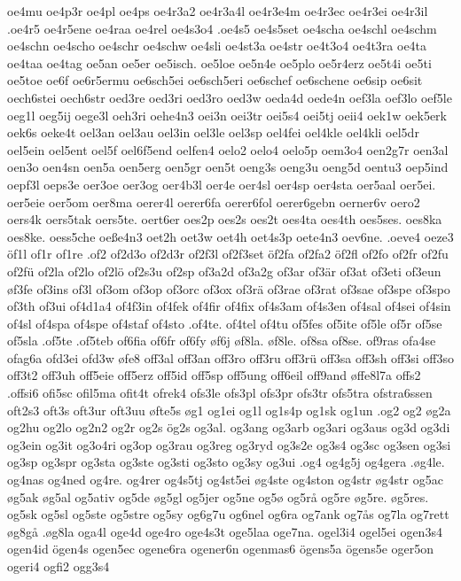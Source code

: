 {{oe4mu
oe4p3r
oe4pl
oe4ps
oe4r3a2
oe4r3a4l
oe4r3e4m
oe4r3ec
oe4r3ei
oe4r3il
.oe4r5
oe4r5ene
oe4raa
oe4rel
oe4s3o4
.oe4s5
oe4s5set
oe4scha
oe4schl
oe4schm
oe4schn
oe4scho
oe4schr
oe4schw
oe4sli
oe4st3a
oe4str
oe4t3o4
oe4t3ra
oe4ta
oe4taa
oe4tag
oe5an
oe5er
oe5isch.
oe5loe
oe5n4e
oe5plo
oe5r4erz
oe5t4i
oe5ti
oe5toe
oe6f
oe6r5ermu
oe6sch5ei
oe6sch5eri
oe6schef
oe6schene
oe6sip
oe6sit
oech6stei
oech6str
oed3re
oed3ri
oed3ro
oed3w
oeda4d
oede4n
oef3la
oef3lo
oef5le
oeg1l
oeg5ij
oege3l
oeh3ri
oehe4n3
oei3n
oei3tr
oei5s4
oei5tj
oeii4
oek1w
oek5erk
oek6s
oeke4t
oel3an
oel3au
oel3in
oel3le
oel3sp
oel4fei
oel4kle
oel4kli
oel5dr
oel5ein
oel5ent
oel5f
oel6f5end
oelfen4
oelo2
oelo4
oelo5p
oem3o4
oen2g7r
oen3al
oen3o
oen4sn
oen5a
oen5erg
oen5gr
oen5t
oeng3s
oeng3u
oeng5d
oentu3
oep5ind
oepf3l
oeps3e
oer3oe
oer3og
oer4b3l
oer4e
oer4sl
oer4sp
oer4sta
oer5aal
oer5ei.
oer5eie
oer5om
oer8ma
oerer4l
oerer6fa
oerer6fol
oerer6gebn
oerner6v
oero2
oers4k
oers5tak
oers5te.
oert6er
oes2p
oes2s
oes2t
oes4ta
oes4th
oes5ses.
oes8ka
oes8ke.
oess5che
oeße4n3
oet2h
oet3w
oet4h
oet4s3p
oete4n3
oev6ne.
.oeve4
oeze3
öf1l
of1r
of1re
.of2
of2d3o
of2d3r
of2f3l
of2f3set
öf2fa
of2fa2
öf2fl
of2fo
of2fr
of2fu
of2fü
of2la
of2lo
of2lö
of2s3u
of2sp
of3a2d
of3a2g
of3ar
of3är
of3at
of3eti
of3eun
øf3fe
of3ins
of3l
of3om
of3op
of3orc
of3ox
of3rä
of3rae
of3rat
of3sae
of3spe
of3spo
of3th
of3ui
of4d1a4
of4f3in
of4fek
of4fir
of4fix
of4s3am
of4s3en
of4sal
of4sei
of4sin
of4sl
of4spa
of4spe
of4staf
of4sto
.of4te.
of4tel
of4tu
of5fes
of5ite
of5le
of5r
of5se
of5sla
.of5te
.of5teb
of6fia
of6fr
of6fy
øf6j
øf8la.
øf8le.
of8sa
of8se.
of9ras
ofa4se
ofag6a
ofd3ei
ofd3w
øfe8
off3al
off3an
off3ro
off3ru
off3rü
off3sa
off3sh
off3si
off3so
off3t2
off3uh
off5eie
off5erz
off5id
off5sp
off5ung
off6eil
off9and
øffe8l7a
offs2
.offsi6
ofi5sc
ofil5ma
ofit4t
ofrek4
ofs3le
ofs3pl
ofs3pr
ofs3tr
ofs5tra
ofstra6ssen
oft2s3
oft3s
oft3ur
oft3uu
øfte5s
øg1
og1ei
og1l
og1s4p
og1sk
og1un
.og2
og2
øg2a
og2hu
og2lo
og2n2
og2r
og2s
ög2s
og3al.
og3ang
og3arb
og3ari
og3aus
og3d
og3di
og3ein
og3it
og3o4ri
og3op
og3rau
og3reg
og3ryd
og3s2e
og3s4
og3sc
og3sen
og3si
og3sp
og3spr
og3sta
og3ste
og3sti
og3sto
og3sy
og3ui
.og4
og4g5j
og4gera
.øg4le.
og4nas
og4ned
og4re.
og4rer
og4s5tj
og4st5ei
øg4ste
og4ston
og4str
øg4str
og5ac
øg5ak
øg5al
og5ativ
og5de
øg5gl
og5jer
og5ne
og5ø
og5rå
og5re
øg5re.
øg5res.
og5sk
og5sl
og5ste
og5stre
og5sy
og6g7u
og6nel
og6ra
og7ank
og7ås
og7la
og7rett
øg8gå
.øg8la
oga4l
oge4d
oge4ro
oge4s3t
oge5laa
oge7na.
ogel3i4
ogel5ei
ogen3s4
ogen4id
ögen4s
ogen5ec
ogene6ra
ogener6n
ogenmas6
ögens5a
ögens5e
oger5on
ogeri4
ogfi2
ogg3s4
}}
